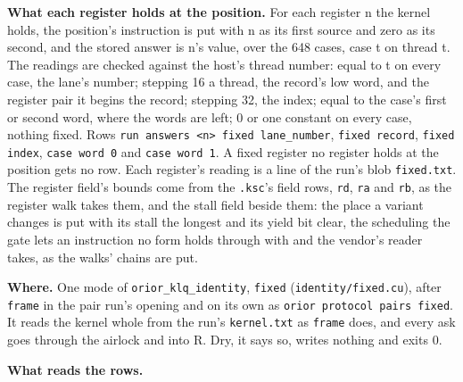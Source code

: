 \textbf{What each register holds at the position.} For each register n the kernel holds, the position's instruction is put with n as its first source and zero as its second, and the stored answer is n's value, over the 648 cases, case t on thread t. The readings are checked against the host's thread number: equal to t on every case, the lane's number; stepping 16 a thread, the record's low word, and the register pair it begins the record; stepping 32, the index; equal to the case's first or second word, where the words are left; 0 or one constant on every case, nothing fixed. Rows \texttt{run answers <n> fixed lane\_\allowbreak{}number}, \texttt{fixed record}, \texttt{fixed index}, \texttt{case word 0} and \texttt{case word 1}. A fixed register no register holds at the position gets no row. Each register's reading is a line of the run's blob \texttt{fixed.\allowbreak{}txt}. The register field's bounds come from the \texttt{.\allowbreak{}ksc}'s field rows, \texttt{rd}, \texttt{ra} and \texttt{rb}, as the register walk takes them, and the stall field beside them: the place a variant changes is put with its stall the longest and its yield bit clear, the scheduling the gate lets an instruction no form holds through with and the vendor's reader takes, as the walks' chains are put.

\textbf{Where.} One mode of \texttt{orior\_\allowbreak{}klq\_\allowbreak{}identity}, \texttt{fixed} (\texttt{identity/\allowbreak{}fixed.\allowbreak{}cu}), after \texttt{frame} in the pair run's opening and on its own as \texttt{orior protocol pairs fixed}. It reads the kernel whole from the run's \texttt{kernel.\allowbreak{}txt} as \texttt{frame} does, and every ask goes through the airlock and into R. Dry, it says so, writes nothing and exits 0.

\textbf{What reads the rows.}

